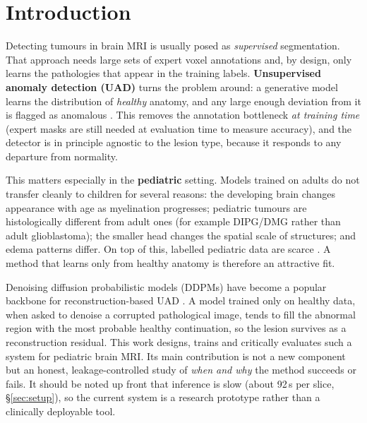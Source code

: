 \documentclass[12pt, a4paper]{article}
\theoremstyle{definition}\newtheorem{definition}{Definition}
\begin{document}

\section{Introduction}
Detecting tumours in brain MRI is usually posed as \emph{supervised}
segmentation. That approach needs large sets of expert voxel annotations and, by
design, only learns the pathologies that appear in the training labels.
\textbf{Unsupervised anomaly detection (UAD)} turns the problem around: a generative
model learns the distribution of \emph{healthy} anatomy, and any large enough
deviation from it is flagged as anomalous \cite{baur2021,schlegl2019}. This removes the
annotation bottleneck \emph{at training time} (expert masks are still needed at
evaluation time to measure accuracy), and the detector is in principle agnostic to the
lesion type, because it responds to any departure from normality.

This matters especially in the \textbf{pediatric} setting. Models trained on adults
do not transfer cleanly to children for several reasons: the developing brain changes
appearance with age as myelination progresses; pediatric tumours are histologically
different from adult ones (for example DIPG/DMG rather than adult glioblastoma); the
smaller head changes the spatial scale of structures; and edema patterns differ. On
top of this, labelled pediatric data are scarce \cite{kazerooni2024}. A method that
learns only from healthy anatomy is therefore an attractive fit.

Denoising diffusion probabilistic models (DDPMs) \cite{ho2020} have become a popular
backbone for reconstruction-based UAD \cite{wyatt2022,behrendt2023}. A model trained
only on healthy data, when asked to denoise a corrupted pathological image, tends to
fill the abnormal region with the most probable healthy continuation, so the lesion
survives as a reconstruction residual. This work designs, trains and critically
evaluates such a system for pediatric brain MRI. Its main contribution is not a new
component but an honest, leakage-controlled study of \emph{when and why} the method
succeeds or fails. It should be noted up front that inference is slow (about 92\,s per
slice, \S\ref{sec:setup}), so the current system is a research prototype rather than a
clinically deployable tool.
\end{document}
